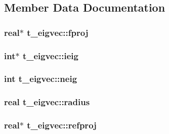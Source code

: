 \subsection{\-Member \-Data \-Documentation}
\hypertarget{structt__eigvec_a47af7c75798c82fe0292f2fda0865353}{
\subsubsection[{fproj}]{\setlength{\rightskip}{0pt plus 5cm}real$\ast$ {\bf t\-\_\-eigvec\-::fproj}}}\label{structt__eigvec_a47af7c75798c82fe0292f2fda0865353}
\hypertarget{structt__eigvec_acae5c5b628812a579a9417bf7c191ea3}{
\subsubsection[{ieig}]{\setlength{\rightskip}{0pt plus 5cm}int$\ast$ {\bf t\-\_\-eigvec\-::ieig}}}\label{structt__eigvec_acae5c5b628812a579a9417bf7c191ea3}
\hypertarget{structt__eigvec_a50b3761c518e7dd6a6d037add3b1c58c}{
\subsubsection[{neig}]{\setlength{\rightskip}{0pt plus 5cm}int {\bf t\-\_\-eigvec\-::neig}}}\label{structt__eigvec_a50b3761c518e7dd6a6d037add3b1c58c}
\hypertarget{structt__eigvec_a37b100692b931f2461c53f52de3226a2}{
\subsubsection[{radius}]{\setlength{\rightskip}{0pt plus 5cm}real {\bf t\-\_\-eigvec\-::radius}}}\label{structt__eigvec_a37b100692b931f2461c53f52de3226a2}
\hypertarget{structt__eigvec_acc1aa42bdf2c340e46497bce4154afec}{
\subsubsection[{refproj}]{\setlength{\rightskip}{0pt plus 5cm}real$\ast$ {\bf t\-\_\-eigvec\-::refproj}}}\label{structt__eigvec_acc1aa42bdf2c340e46497bce4154afec}
